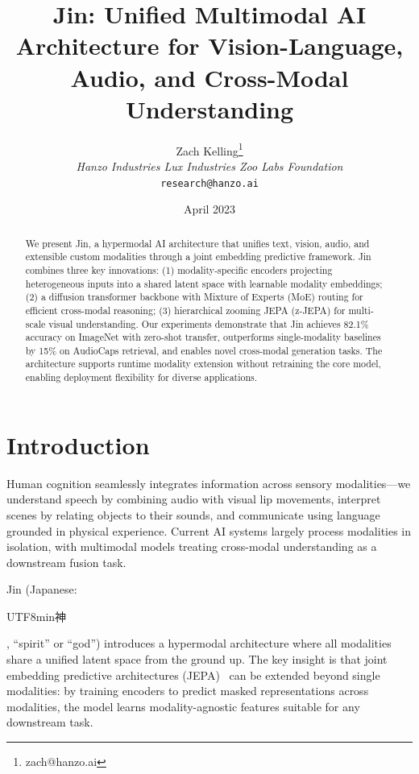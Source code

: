 \documentclass[11pt,twocolumn]{article}
\title{Jin: Unified Multimodal AI Architecture for Vision-Language, Audio, and Cross-Modal Understanding}
\author{Zach Kelling\thanks{zach@hanzo.ai} \\ \textit{Hanzo Industries \quad Lux Industries \quad Zoo Labs Foundation} \\ \texttt{research@hanzo.ai}}
\date{April 2023}
\begin{document}
\luxcoverpage
\maketitle

\begin{abstract}
We present Jin, a hypermodal AI architecture that unifies text, vision, audio, and extensible custom modalities through a joint embedding predictive framework. Jin combines three key innovations: (1) modality-specific encoders projecting heterogeneous inputs into a shared latent space with learnable modality embeddings; (2) a diffusion transformer backbone with Mixture of Experts (MoE) routing for efficient cross-modal reasoning; (3) hierarchical zooming JEPA (z-JEPA) for multi-scale visual understanding. Our experiments demonstrate that Jin achieves 82.1\% accuracy on ImageNet with zero-shot transfer, outperforms single-modality baselines by 15\% on AudioCaps retrieval, and enables novel cross-modal generation tasks. The architecture supports runtime modality extension without retraining the core model, enabling deployment flexibility for diverse applications.
\end{abstract}

\section{Introduction}

Human cognition seamlessly integrates information across sensory modalities---we understand speech by combining audio with visual lip movements, interpret scenes by relating objects to their sounds, and communicate using language grounded in physical experience. Current AI systems largely process modalities in isolation, with multimodal models treating cross-modal understanding as a downstream fusion task.

Jin (Japanese: \begin{CJK}{UTF8}{min}神\end{CJK}, ``spirit'' or ``god'') introduces a hypermodal architecture where all modalities share a unified latent space from the ground up. The key insight is that joint embedding predictive architectures (JEPA)~\cite{jepa2022} can be extended beyond single modalities: by training encoders to predict masked representations across modalities, the model learns modality-agnostic features suitable for any downstream task.
\end{document}
